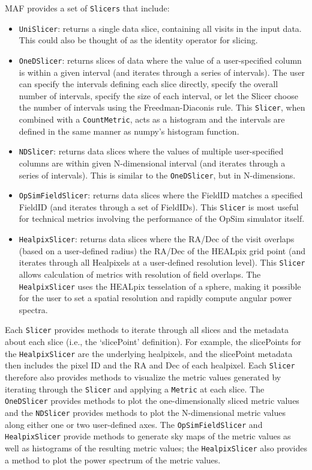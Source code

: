 \documentclass[]{spie}  %
\begin{document}
MAF provides a set of {\tt Slicers} that include:
\begin{itemize}
\item{{\tt UniSlicer}: returns a single data slice, containing all visits in
the input data. This could also be thought of as the identity operator
for slicing.}
\item{{\tt OneDSlicer}: returns slices of data where the value of a
user-specified column is within a given interval (and iterates through
a series of intervals).  The user can specify the intervals defining
each slice directly, specify the overall number of intervals, specify
the size of each interval, or let the Slicer choose the number of
intervals using the Freedman-Diaconis rule. This
{\tt Slicer}, when combined with a {\tt CountMetric}, acts as a histogram and the
intervals are defined in the same manner as numpy's histogram
function.}
\item{{\tt NDSlicer}: returns data slices where the values of multiple
user-specified columns are within given N-dimensional interval (and
iterates through a series of intervals). This is similar to the {\tt OneDSlicer}, but
in N-dimensions.}
\item{{\tt OpSimFieldSlicer}: returns data slices where the FieldID
matches a specified FieldID (and iterates through a set of
FieldIDs). This {\tt Slicer} is most useful for technical metrics involving
the performance of the OpSim simulator itself.}
\item{{\tt HealpixSlicer}: returns data slices where the RA/Dec of the
visit overlaps (based on a user-defined radius) the RA/Dec of the
HEALpix grid point (and iterates through all Healpixels at a
user-defined resolution level). This {\tt Slicer} allows calculation of
metrics with resolution of field overlaps. The {\tt HealpixSlicer} uses the 
HEALpix tesselation of a sphere\cite{healpix}, 
making it possible for the 
user to set a spatial resolution and rapidly compute angular power spectra.}
\end{itemize}
Each {\tt Slicer} provides methods to iterate through all slices and
the metadata about each slice (i.e., the `slicePoint' definition). For
example, the slicePoints for the
{\tt HealpixSlicer} are the underlying healpixels, and the slicePoint
metadata then includes the pixel ID and the RA and Dec of each
healpixel. Each {\tt Slicer} therefore also
provides methods to visualize the metric values generated by iterating
through the {\tt Slicer} and applying a {\tt Metric} at each
slice. The {\tt OneDSlicer} provides methods to plot the
one-dimensionally sliced metric values and the {\tt NDSlicer} provides methods to plot
the N-dimensional metric values along either one or two user-defined
axes. The {\tt OpSimFieldSlicer} and {\tt HealpixSlicer} provide methods to
generate sky maps of the metric values as well as histograms of the
resulting metric values; the {\tt HealpixSlicer} also provides a method to
plot the power spectrum of the metric values. 
\end{document}
